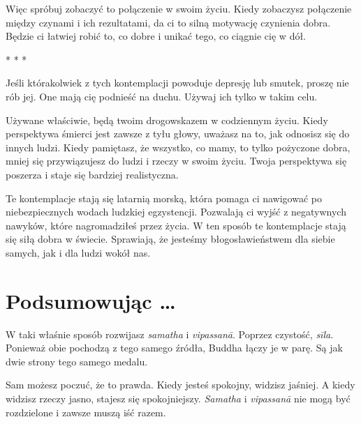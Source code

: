 \documentclass[12pt,openany]{book}
\begin{document}
Więc spróbuj zobaczyć to połączenie w swoim życiu. Kiedy zobaczysz połączenie między czynami i ich rezultatami, da ci to silną motywację czynienia dobra. Będzie ci łatwiej robić to, co dobre i unikać tego, co ciągnie cię w dół.

\begin{center}
* * *
\end{center}

Jeśli którakolwiek z tych kontemplacji powoduje depresję lub smutek, proszę nie rób jej. One mają cię podnieść na duchu. Używaj ich tylko w takim celu.

Używane właściwie, będą twoim drogowskazem w codziennym życiu. Kiedy perspektywa śmierci jest zawsze z tyłu głowy, uważasz na to, jak odnosisz się do innych ludzi. Kiedy pamiętasz, że wszystko, co mamy, to tylko pożyczone dobra, mniej się przywiązujesz do ludzi i rzeczy w swoim życiu. Twoja perspektywa się poszerza i staje się bardziej realistyczna.


Te kontemplacje stają się latarnią morską, która pomaga ci nawigować po niebezpiecznych wodach ludzkiej egzystencji. Pozwalają ci wyjść z negatywnych nawyków, które nagromadziłeś przez życia. W ten sposób te kontemplacje stają się siłą dobra w świecie. Sprawiają, że jesteśmy błogosławieństwem dla siebie samych, jak i dla ludzi wokół nas.

\chapter*{Podsumowując …}

W taki właśnie sposób rozwijasz \textit{samatha} i \textit{vipassanā}. Poprzez czystość, \textit{sīla}. Ponieważ obie pochodzą z tego samego źródła, Buddha łączy je w parę. Są jak dwie strony tego samego medalu.

Sam możesz poczuć, że to prawda. Kiedy jesteś spokojny, widzisz jaśniej. A kiedy widzisz rzeczy jasno, stajesz się spokojniejszy. \textit{Samatha} i \textit{vipassanā} nie mogą być rozdzielone i zawsze muszą iść razem.




\hspace*{-7mm}
\end{document}

